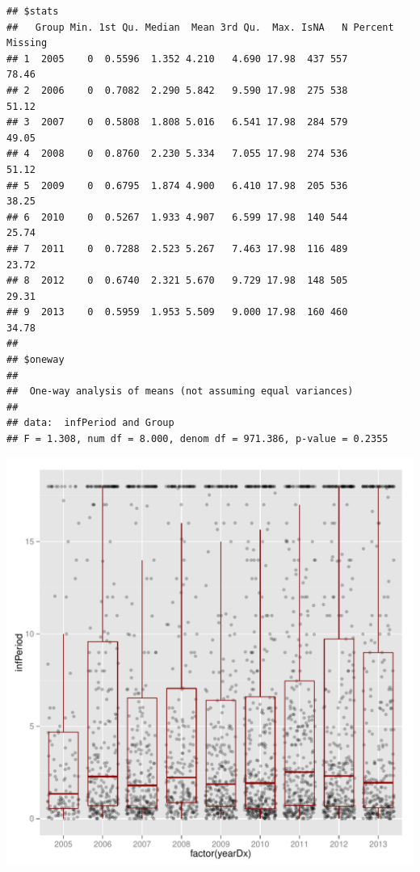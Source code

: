 \documentclass{article}\usepackage[]{graphicx}\usepackage[]{color}
\makeatletter
\def\maxwidth{ %
  \ifdim\Gin@nat@width>\linewidth
    \linewidth
  \else
    \Gin@nat@width
  \fi
}
\newenvironment{kframe}{%
 \def\at@end@of@kframe{}%
 \ifinner\ifhmode%
  \def\at@end@of@kframe{\end{minipage}}%
  \begin{minipage}{\columnwidth}%
 \fi\fi%
 \def\FrameCommand##1{\hskip\@totalleftmargin \hskip-\fboxsep
 \colorbox{shadecolor}{##1}\hskip-\fboxsep
     \hskip-\linewidth \hskip-\@totalleftmargin \hskip\columnwidth}%
 \MakeFramed {\advance\hsize-\width
   \@totalleftmargin\z@ \linewidth\hsize
   \@setminipage}}%
 {\par\unskip\endMakeFramed%
 \at@end@of@kframe}
\newenvironment{knitrout}{}{} %
\makeatother
\begin{document}
\begin{knitrout}\footnotesize
{}\color{fgcolor}\begin{kframe}
\begin{verbatim}
## $stats
##   Group Min. 1st Qu. Median  Mean 3rd Qu.  Max. IsNA   N Percent Missing
## 1  2005    0  0.5596  1.352 4.210   4.690 17.98  437 557           78.46
## 2  2006    0  0.7082  2.290 5.842   9.590 17.98  275 538           51.12
## 3  2007    0  0.5808  1.808 5.016   6.541 17.98  284 579           49.05
## 4  2008    0  0.8760  2.230 5.334   7.055 17.98  274 536           51.12
## 5  2009    0  0.6795  1.874 4.900   6.410 17.98  205 536           38.25
## 6  2010    0  0.5267  1.933 4.907   6.599 17.98  140 544           25.74
## 7  2011    0  0.7288  2.523 5.267   7.463 17.98  116 489           23.72
## 8  2012    0  0.6740  2.321 5.670   9.729 17.98  148 505           29.31
## 9  2013    0  0.5959  1.953 5.509   9.000 17.98  160 460           34.78
## 
## $oneway
## 
## 	One-way analysis of means (not assuming equal variances)
## 
## data:  infPeriod and Group
## F = 1.308, num df = 8.000, denom df = 971.386, p-value = 0.2355
\end{verbatim}


{\ttfamily\noindent\color{warningcolor}{\#\# Warning: Removed 2039 rows containing non-finite values (stat\_boxplot).\\\#\# Warning: Removed 2039 rows containing missing values (geom\_point).}}\end{kframe}

{\centering \includegraphics[width=\maxwidth]{figure/minimal-time} 

}



\end{knitrout}
\end{document}
